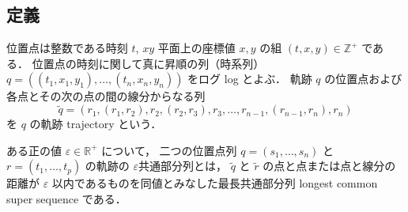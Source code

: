 \documentclass[11pt]{jreport}
\begin{document}
\subsection*{定義}
位置点は整数である時刻 $t$, $xy$ 平面上の座標値 $x, y$ の組 $(t, x, y) \in \mathbb{Z}^+$ である． 
位置点の時刻に関して真に昇順の列（時系列） $q = ((t_1, x_1, y_1), \ldots,(t_n,x_n,y_n))$ をログ log とよぶ．
軌跡 $q$ の位置点および各点とその次の点の間の線分からなる列
\[
\tilde{q} = (r_1, (r_1, r_2), r_2, (r_2, r_3), r_3, \ldots, r_{n-1}, (r_{n-1}, r_n), r_n)
\]
を $q$ の軌跡 trajectory という．

\begin{defn}[位置点列マッチング]
ある正の値 $\varepsilon \in \mathbb{R}^+$ について，
二つの位置点列 $q = (s_1, \ldots, s_n)$ と $r = (t_1, \ldots, t_p)$ の軌跡の $\varepsilon$共通部分列とは，
 $\tilde{q}$ と $\tilde{r}$ の点と点または点と線分の距離が $\varepsilon$ 以内であるものを同値とみなした最長共通部分列 longest common super sequence である．
\end{defn}
\end{document}
